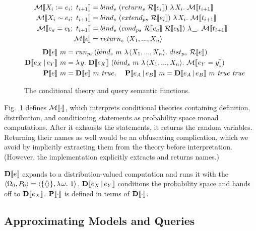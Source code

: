 \begin{figure}[tb]
\centering
\begin{equation*}
\begin{split}
	\PS{X_i := e_i;\ t_{i+1}}
		&= \appp \bind {\papp \ret {\RV{e_i}}} {\fun {X_i} {\PS{t_{i+1}}}} \\
	\PS{X_i \sim e_i;\ t_{i+1}}
		&= \appp \bind {\papp \extendps {\RV{e_i}}} {\fun {X_i} {\PS{t_{i+1}}}} \\
	\PS{e_a = e_b;\ t_{i+1}}
		&= \appp \bind {\pappp \condps {\RV{e_a}} {\RV{e_b}}} {\fun \uscore {\PS{t_{i+1}}}} \\
	\PS{\epsilon}
		&= \app \ret {\seq{X_1, \dots, X_n}}
\end{split}
\end{equation*}
\begin{equation*}
\begin{split}
	\app {\Dist{e}} m
		&= \runps \pappp \bind m {\fun {\seq{X_1,\dots,X_n}} {\app \distps {\RV{e}}}} \\
	\app {\Dist{e_X \given e_Y}} m
		&= \fun y {\app {\Dist{e_X}} {\pappp \bind m {\fun {\seq{X_1,\dots,X_n}} {\PS{e_Y = y}}}}} \\
	\app {\Prob{e}} m &= \appp {\Dist{e}} m \true, \;\;\;\;
	\app {\Prob{e_A \given e_B}} m = \apppp {\Dist{e_A \given e_B}} m \true \true \\
\end{split}
\end{equation*}
\hrulefill
\caption[Theory extension and query semantic functions]{The conditional theory and query semantic functions.}
\label{fig:ps}
\end{figure}

Fig.~\ref{fig:ps} defines $\mathcal{M}\!\left\llbracket{\cdot}\right\rrbracket$, which interprets conditional theories containing definition, distribution, and conditioning statements as probability space monad computations. After it exhausts the statements, it returns the random variables. Returning their names as well would be an obfuscating complication, which we avoid by implicitly extracting them from the theory before interpretation. (However, the implementation explicitly extracts and returns names.)

$\mathbf{D}\!\left\llbracket{e}\right\rrbracket$ expands to a distribution-valued computation and runs it with the  $\langle{\Omega_0,P_0}\rangle = \langle{\{{\langle{}\rangle}\},\lambda\mspace{2mu}{\omega}\ldotp\, 1}\rangle$. $\mathbf{D}\!\left\llbracket{e_X \,|\,e_Y}\right\rrbracket$ conditions the probability space and hands off to $\mathbf{D}\!\left\llbracket{e_X}\right\rrbracket$. $\mathbf{P}\!\left\llbracket{\cdot}\right\rrbracket$ is defined in terms of $\mathbf{D}\!\left\llbracket{\cdot}\right\rrbracket$.

\subsection{Approximating Models and Queries}

